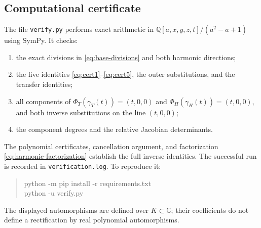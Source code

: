 \documentclass[11pt,a4paper]{article}
\newcommand{\Q}{\mathbb Q}
\newcommand{\C}{\mathbb C}
\begin{document}
\subsection{Computational certificate}

The file \texttt{verify.py} performs exact arithmetic in
$\Q[a,x,y,z,t]/(a^2-a+1)$ using SymPy. It checks:
\begin{enumerate}
\item the exact divisions in \eqref{eq:base-divisions} and both harmonic
      directions;
\item the five identities \eqref{eq:cert1}--\eqref{eq:cert5}, the outer
      substitutions, and the transfer identities;
\item all components of $\Phi_T(\gamma_T(t))=(t,0,0)$ and
      $\Phi_H(\gamma_H(t))=(t,0,0)$, and both inverse substitutions on
      the line $(t,0,0)$;
\item the component degrees and the relative Jacobian determinants.
\end{enumerate}
The polynomial certificates, cancellation argument, and factorization
\eqref{eq:harmonic-factorization} establish the full inverse identities.
The successful run is recorded in \texttt{verification.log}. To reproduce it:
\begin{quote}\ttfamily\small
python -m pip install -r requirements.txt\\
python -u verify.py
\end{quote}
The displayed automorphisms are defined over $K\subset\C$; their
coefficients do not define a rectification by real polynomial automorphisms.

\clearpage

\end{document}
